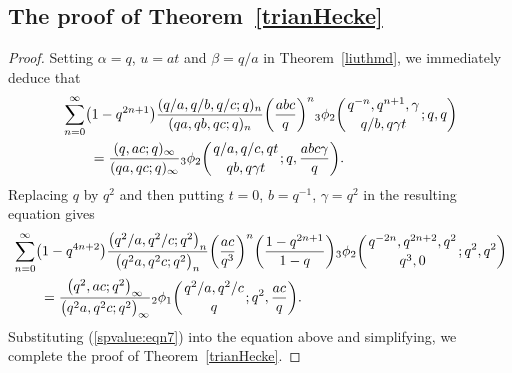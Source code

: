 \documentclass[10pt,a4paper]{amsart}
\numberwithin{equation}{section}
\begin{document}
\subsection{The proof of Theorem~\ref{trianHecke}}
\begin{proof}
Setting $\alpha=q$, $u=at$ and $\beta=q/a$ in Theorem~\ref{liuthmd}, we immediately deduce that
\begin{align}
	&\sum_{n=0}^\infty\bigl(1-q^{2n+1}\bigr) \frac{(q/a, q/b, q/c; q)_n}{(qa, qb, qc; q)_n} \biggl(\frac{abc}{q}\biggr)^n {_3\phi_2}\biggl({{q^{-n}, q^{n+1}, \gamma}\atop{q/b, q\gamma t}}; q, q\biggr)\nonumber\\
	&\qquad{}=\frac{(q, ac; q)_\infty}{(qa, qc; q)_\infty}
	{_3\phi_2}\biggl({{q/a, q/c, qt}\atop{qb, q\gamma t}}; q, \frac{abc\gamma}{q}\biggr).\label{trih:eqn2}	
\end{align}	
Replacing $q$ by $q^2$ and then putting $t=0$, $b=q^{-1}$, $\gamma=q^2$ in the resulting equation gives 		
	\begin{align*}
		&	\sum_{n=0}^\infty \bigl(1-q^{4n+2}\bigr) \frac{\bigl(q^2/a, q^2/c; q^2\bigr)_n}{\bigl(q^2a, q^2c; q^2\bigr)_n} \biggl(\frac{ac}{q^3}\biggr)^n
		 \biggl(\frac{1-q^{2n+1}}{1-q}\biggr){_3\phi_2}\biggl({{q^{-2n}, q^{2n+2}, q^2}\atop{q^3, 0}}; q^2, q^2\biggr)\\
		&\qquad{}=\frac{\bigl(q^2, ac; q^2\bigr)_\infty}{\bigl(q^2a, q^2c; q^2\bigr)_\infty}
		{_2\phi_1}\biggl({{q^2/a, q^2/c}\atop{q}}; q^2, \frac{ac}{q}\biggr).
	\end{align*}
	Substituting (\ref{spvalue:eqn7}) into the equation above and simplifying, we complete the proof of Theorem~\ref{trianHecke}.
\end{proof}
\end{document}
